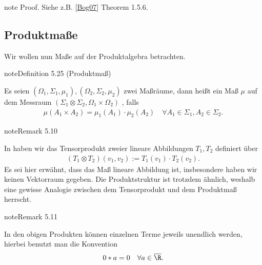\documentclass[letterpaper,10pt,german]{jupyterBook}
\begin{document}
\begin{sphinxadmonition}{note}
\sphinxAtStartPar
Proof. Siehe z.B. {[}\hyperlink{cite.references:id5}{Bog07}{]} Theorem 1.5.6.
\end{sphinxadmonition}


\subsection{Produktmaße}
\label{\detokenize{masstheorie/integrationstechnik:produktmasze}}
\sphinxAtStartPar
Wir wollen nun Maße auf der Produktalgebra betrachten.
\label{masstheorie/integrationstechnik:definition-6}
\begin{sphinxadmonition}{note}{Definition 5.25 (Produktmaß)}



\sphinxAtStartPar
Es seien \((\Omega_1,\Sigma_1,\mu_1), (\Omega_2,\Sigma_2,\mu_2)\) zwei Maßräume, dann heißt ein Maß \(\mu\) auf dem Messraum \((\Sigma_1\otimes\Sigma_2, \Omega_1\times\Omega_2)\) , falls
\begin{equation*}
\begin{split}\mu(A_1\times A_2) = \mu_1(A_1)\cdot\mu_2(A_2)\quad\forall A_1\in\Sigma_1, A_2\in\Sigma_2.\end{split}
\end{equation*}\end{sphinxadmonition}
\label{masstheorie/integrationstechnik:remark-7}
\begin{sphinxadmonition}{note}{Remark 5.10}



\sphinxAtStartPar
In {\hyperref[\detokenize{vektoranalysis/tensor:s-grass}]{}} haben wir das Tensorprodukt zweier lineare Abbildungen \(T_1,T_2\) definiert über
\begin{equation*}
\begin{split}(T_1\otimes T_2)(v_1,v_2) := T_1(v_1)\cdot T_2(v_2).\end{split}
\end{equation*}
\sphinxAtStartPar
Es sei hier erwähnt, dass das Maß  lineare Abbildung ist, insbesondere haben wir keinen Vektorraum gegeben. Die Produktstruktur ist trotzdem ähnlich, weshalb eine gewisse Analogie zwischen dem Tensorprodukt und dem Produktmaß herrscht.
\end{sphinxadmonition}
\label{masstheorie/integrationstechnik:remark-8}
\begin{sphinxadmonition}{note}{Remark 5.11}



\sphinxAtStartPar
In den obigen Produkten können einzelnen Terme jeweils unendlich werden, hierbei benutzt man die Konvention
\begin{equation*}
\begin{split}0 * a = 0\quad\forall a\in\overline{\R}.\end{split}
\end{equation*}\end{sphinxadmonition}
\end{document}

